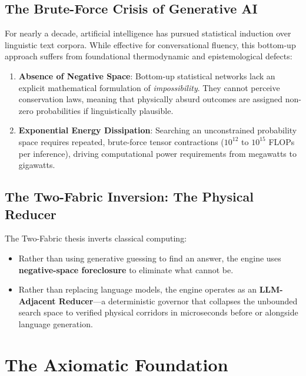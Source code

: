 \documentclass[11pt,a4paper]{article}
\begin{document}
\subsection{The Brute-Force Crisis of Generative AI}
For nearly a decade, artificial intelligence has pursued statistical induction over linguistic text corpora. While effective for conversational fluency, this bottom-up approach suffers from foundational thermodynamic and epistemological defects:
\begin{enumerate}
    \item \textbf{Absence of Negative Space}: Bottom-up statistical networks lack an explicit mathematical formulation of \emph{impossibility}. They cannot perceive conservation laws, meaning that physically absurd outcomes are assigned non-zero probabilities if linguistically plausible.
    \item \textbf{Exponential Energy Dissipation}: Searching an unconstrained probability space requires repeated, brute-force tensor contractions ($10^{12}$ to $10^{15}$ FLOPs per inference), driving computational power requirements from megawatts to gigawatts.
\end{enumerate}

\subsection{The Two-Fabric Inversion: The Physical Reducer}
The Two-Fabric thesis inverts classical computing:
\begin{itemize}
    \item Rather than using generative guessing to find an answer, the engine uses \textbf{negative-space foreclosure} to eliminate what cannot be.
    \item Rather than replacing language models, the engine operates as an \textbf{LLM-Adjacent Reducer}—a deterministic governor that collapses the unbounded search space to verified physical corridors in microseconds before or alongside language generation.
\end{itemize}

\section{The Axiomatic Foundation}
\end{document}
